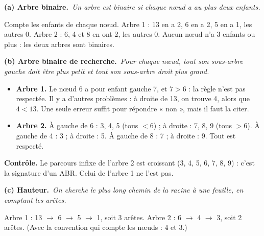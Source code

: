 \documentclass[11pt, a4paper]{exam}
\newcommand{\Qp}[2]{\par\medskip\noindent\textbf{#1}\ \textit{#2}\par\nopagebreak\smallskip}
\begin{document}
\Qp{(a) Arbre binaire.}{Un arbre est binaire si chaque nœud a au plus deux enfants.}
Compte les enfants de chaque nœud. Arbre 1 : 13 en a 2, 6 en a 2, 5 en a 1, les autres 0. Arbre 2 : 6, 4 et 8 en ont 2, les autres 0. Aucun nœud n'a 3 enfants ou plus : les deux arbres sont binaires.

\Qp{(b) Arbre binaire de recherche.}{Pour chaque nœud, tout son sous-arbre gauche doit être plus petit et tout son sous-arbre droit plus grand.}
\begin{itemize}
\item \textbf{Arbre 1.} Le nœud 6 a pour enfant gauche 7, et $7 > 6$ : la règle n'est pas respectée. Il y a d'autres problèmes : à droite de 13, on trouve 4, alors que $4 < 13$. Une seule erreur suffit pour répondre « non », mais il faut la citer.
\item \textbf{Arbre 2.} À gauche de 6 : 3, 4, 5 (tous $< 6$) ; à droite : 7, 8, 9 (tous $> 6$). À gauche de 4 : 3 ; à droite : 5. À gauche de 8 : 7 ; à droite : 9. Tout est respecté.
\end{itemize}
\textbf{Contrôle.} Le parcours infixe de l'arbre 2 est croissant (3, 4, 5, 6, 7, 8, 9) : c'est la signature d'un ABR. Celui de l'arbre 1 ne l'est pas.

\Qp{(c) Hauteur.}{On cherche le plus long chemin de la racine à une feuille, en comptant les arêtes.}
Arbre 1 : 13 $\to$ 6 $\to$ 5 $\to$ 1, soit 3 arêtes. Arbre 2 : 6 $\to$ 4 $\to$ 3, soit 2 arêtes. (Avec la convention qui compte les nœuds : 4 et 3.)
\end{document}
